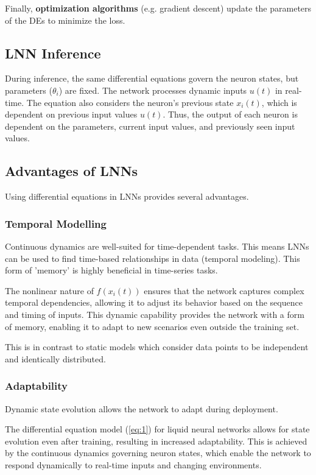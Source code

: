 Finally, \textbf{optimization algorithms} (e.g. gradient descent) update the parameters of the DEs to minimize the loss.

\subsection{LNN Inference}
During inference, the same differential equations govern the neuron states, but parameters (\(\theta_i\)) are fixed. The network processes dynamic inputs \(u(t)\) in real-time. The equation also considers the neuron's previous state \(x_i(t)\), which is dependent on previous input values \(u(t)\). Thus, the output of each neuron is dependent on the parameters, current input values, and previously seen input values.

\subsection{Advantages of LNNs}
Using differential equations in LNNs provides several advantages.
\subsubsection{Temporal Modelling}
Continuous dynamics are well-suited for time-dependent tasks. This means LNNs can be used to find time-based relationships in data (temporal modeling). This form of 'memory' is highly beneficial in time-series tasks.

The nonlinear nature of \(f(x_i(t))\) ensures that the network captures complex temporal dependencies, allowing it to adjust its behavior based on the sequence and timing of inputs. This dynamic capability provides the network with a form of memory, enabling it to adapt to new scenarios even outside the training set.

This is in contrast to static models which consider data points to be independent and identically distributed.

\subsubsection{Adaptability}
Dynamic state evolution allows the network to adapt during deployment.

The differential equation model (\ref{eq:1}) for liquid neural networks allows for state evolution even after training, resulting in increased adaptability. This is achieved by the continuous dynamics governing neuron states, which enable the network to respond dynamically to real-time inputs and changing environments.

